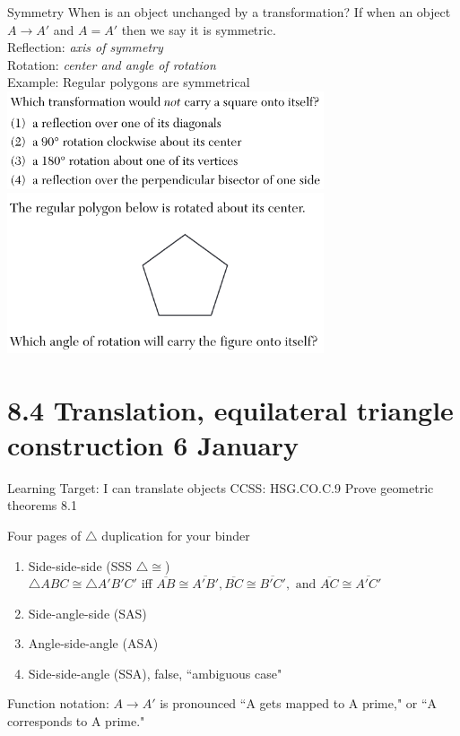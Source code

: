 \begin{frame}{Symmetry}
  {When is an object unchanged by a transformation?}
  If when an object $A \rightarrow A'$ and $A = A'$ then we say it is symmetric. \\
  Reflection: \emph{axis of symmetry}\\
  Rotation: \emph{center and angle of rotation}\\[0.25cm]
  Example: Regular polygons are symmetrical\\[0.25cm]
  \pause \includegraphics[width=0.7\textwidth]{../graphics/symmetry-square_JA2018-15.png}\\
  \pause \includegraphics[width=0.7\textwidth]{../graphics/symmetry_JN2018-19.png}
\end{frame}





\section{8.4 Translation, equilateral triangle construction \hfill 6 January}
\begin{frame}{Learning Target: I can translate objects}
{CCSS: HSG.CO.C.9 Prove geometric theorems \hfill \alert{8.1}}
  \begin{block}{Four pages of $\triangle$ duplication for your binder}
    \begin{enumerate}
        \item Side-side-side (SSS $\triangle \cong$)\\
        $\triangle ABC \cong \triangle A'B'C'$ iff $\overline{AB} \cong \overline{A'B'}, \overline{BC} \cong \overline{B'C'}, \text{ and } \overline{AC} \cong \overline{A'C'}$
        \item Side-angle-side (SAS)
        \item Angle-side-angle (ASA)
        \item Side-side-angle (SSA), false, ``ambiguous case"
    \end{enumerate}
    \end{block}
    Function notation: $A \rightarrow A'$ is pronounced ``A gets mapped to A prime," or ``A corresponds to A prime."
  \end{frame}

